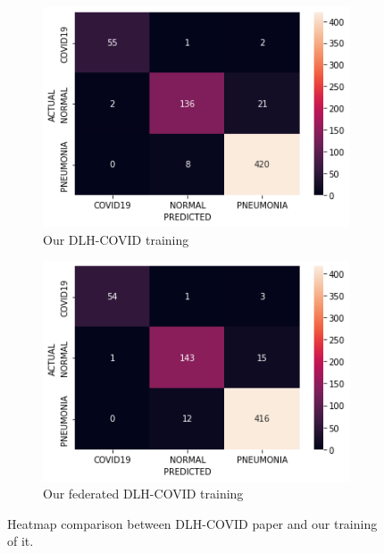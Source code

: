 \begin{figure}[htbp]
    \vspace{.3cm}
    \begin{subfigure}{.35\textwidth}
      \centering
      \includegraphics[width=\linewidth]{imgs/dlh_covid_own_seq_heatmap.png}
      \caption{Our DLH-COVID training}
      \label{fig:dlh_seq_heatmap}
    \end{subfigure}
    \begin{subfigure}{.35\textwidth}
      \centering
      \includegraphics[width=\linewidth]{imgs/dlh_covid_own_fed_heatmap.png}
      \caption{Our federated DLH-COVID training}
      \label{fig:dlh_fed_heatmap}
    \end{subfigure}
    \caption{Heatmap comparison between DLH-COVID paper\cite{dlh_net} and our training of it.}
    \label{fig:dlh_all_heatmaps}
\end{figure}

